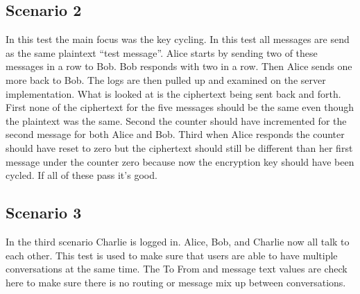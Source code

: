 \subsection{Scenario 2}


In this test the main focus was the key cycling. In this test all messages are send as the same plaintext “test message”. Alice starts by sending two of these messages in a row to Bob. Bob responds with two in a row. Then Alice sends one more back to Bob. The logs are then pulled up and examined on the server implementation. What is looked at is the ciphertext being sent back and forth. First none of the ciphertext for the five messages should be the same even though the plaintext was the same. Second the counter should have incremented for the second message for both Alice and Bob. Third when Alice responds the counter should have reset to zero but the ciphertext should still be different than her first message under the counter zero because now the encryption key should have been cycled. If all of these pass it’s good.


\subsection{Scenario 3}


In the third scenario Charlie is logged in. Alice, Bob, and Charlie now all talk to each other. This test is used to make sure that users are able to have multiple conversations at the same time. The To From and message text values are check here to make sure there is no routing or message mix up between conversations.



